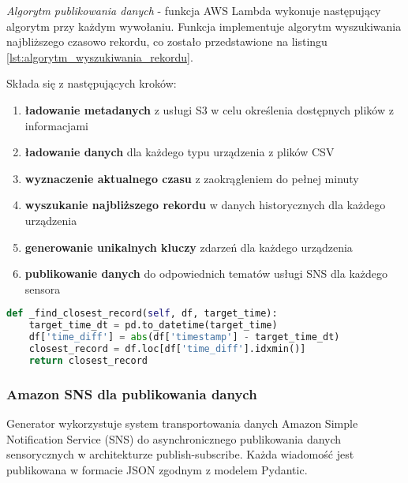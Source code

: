 \textit{Algorytm publikowania danych} - funkcja AWS Lambda wykonuje następujący algorytm przy każdym wywołaniu. Funkcja implementuje algorytm wyszukiwania najbliższego czasowo rekordu, co zostało przedstawione na listingu \ref{lst:algorytm_wyszukiwania_rekordu}. 

\vspace{0.3em}

Składa się z następujących kroków:

\begin{enumerate}
    \item \textbf{ładowanie metadanych} z usługi S3 w celu określenia dostępnych plików z informacjami
    \item \textbf{ładowanie danych} dla każdego typu urządzenia z plików CSV
    \item \textbf{wyznaczenie aktualnego czasu} z zaokrągleniem do pełnej minuty
    \item \textbf{wyszukanie najbliższego rekordu} w danych historycznych dla każdego urządzenia
    \item \textbf{generowanie unikalnych kluczy} zdarzeń dla każdego urządzenia
    \item \textbf{publikowanie danych} do odpowiednich tematów usługi SNS dla każdego sensora
\end{enumerate}

\vspace{0.3em}

\begin{lstlisting}[language=Python, caption=Algorytm wyszukiwania najbliższego rekordu, label={lst:algorytm_wyszukiwania_rekordu}]
def _find_closest_record(self, df, target_time):
    target_time_dt = pd.to_datetime(target_time)
    df['time_diff'] = abs(df['timestamp'] - target_time_dt)
    closest_record = df.loc[df['time_diff'].idxmin()]
    return closest_record
\end{lstlisting}

\subsubsection{Amazon SNS dla publikowania danych}
\label{subsec:amazon_sns}

Generator wykorzystuje system transportowania danych Amazon Simple Notification Service (SNS) do asynchronicznego publikowania danych sensorycznych w architekturze publish-subscribe. Każda wiadomość jest publikowana w formacie JSON zgodnym z modelem Pydantic.

\vspace{0.3em}

